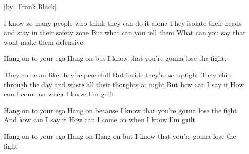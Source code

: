  

[by=Frank Black]




\beginverse
I know so many people who think they can do it alone
They isolate their heads and stay in their safety zone
But what can you tell them
What can you say that wont make them defensive
\endverse

\beginchorus
Hang on to your ego
Hang on but I know that you're gonna lose the fight.
\endchorus

\beginverse
They come on like they're peacefull
But inside they're so uptight
They chip through the day and waste all their thoughts at night
But how can I say it
How can I come on when I know I'm guilt
\endverse

\beginchorus
Hang on to your ego
Hang on because I know that you're gonna lose the fight
And how can I say it
How can I come on when I know I'm guilt
\endchorus

\beginverse
Hang on to your ego
Hang on
Hang on but I know that you're gonna lose the fight
\endverse

\endsong
